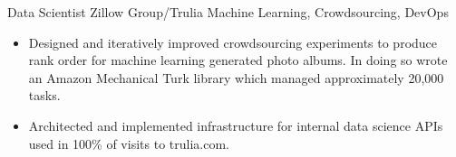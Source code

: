 \documentclass[11pt,a4paper,sans]{moderncv} %
\begin{document}
		{Data Scientist}
		{Zillow Group/Trulia}
		{Machine Learning, Crowdsourcing, DevOps}
		{}
		{
			\begin{itemize}
				\item Designed and iteratively improved crowdsourcing experiments to produce rank order for machine learning generated photo albums. In doing so wrote an Amazon Mechanical Turk library which managed approximately 20,000 tasks.
				\item Architected and implemented infrastructure for internal data science APIs used in 100\% of visits to trulia.com.
			\end{itemize}
		}
\end{document}
